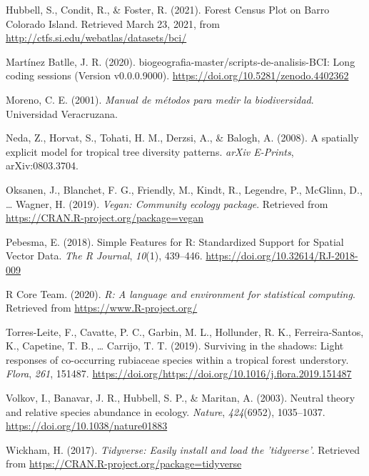 \documentclass[11pt,]{article}
\begin{document}
\hypertarget{ref-web_bci}{}
Hubbell, S., Condit, R., \& Foster, R. (2021). Forest Census Plot on
Barro Colorado Island. Retrieved March 23, 2021, from
\url{http://ctfs.si.edu/webatlas/datasets/bci/}

\hypertarget{ref-jose_ramon_martinez_batlle_2020_4402362}{}
Martínez Batlle, J. R. (2020).
biogeografia-master/scripts-de-analisis-BCI: Long coding sessions
(Version v0.0.0.9000). \url{https://doi.org/10.5281/zenodo.4402362}

\hypertarget{ref-moreno2001manual}{}
Moreno, C. E. (2001). \emph{Manual de métodos para medir la
biodiversidad}. Universidad Veracruzana.

\hypertarget{ref-2008arXiv0803.3704N}{}
Neda, Z., Horvat, S., Tohati, H. M., Derzsi, A., \& Balogh, A. (2008). A
spatially explicit model for tropical tree diversity patterns.
\emph{arXiv E-Prints}, arXiv:0803.3704.

\hypertarget{ref-cita_vegan}{}
Oksanen, J., Blanchet, F. G., Friendly, M., Kindt, R., Legendre, P.,
McGlinn, D., \ldots{} Wagner, H. (2019). \emph{Vegan: Community ecology
package}. Retrieved from \url{https://CRAN.R-project.org/package=vegan}

\hypertarget{ref-cita_sf}{}
Pebesma, E. (2018). Simple Features for R: Standardized Support for
Spatial Vector Data. \emph{The R Journal}, \emph{10}(1), 439--446.
\url{https://doi.org/10.32614/RJ-2018-009}

\hypertarget{ref-cita_r}{}
R Core Team. (2020). \emph{R: A language and environment for statistical
computing}. Retrieved from \url{https://www.R-project.org/}

\hypertarget{ref-TORRESLEITE2019151487}{}
Torres-Leite, F., Cavatte, P. C., Garbin, M. L., Hollunder, R. K.,
Ferreira-Santos, K., Capetine, T. B., \ldots{} Carrijo, T. T. (2019).
Surviving in the shadows: Light responses of co-occurring rubiaceae
species within a tropical forest understory. \emph{Flora}, \emph{261},
151487.
\url{https://doi.org/https://doi.org/10.1016/j.flora.2019.151487}

\hypertarget{ref-Volkov_2003}{}
Volkov, I., Banavar, J. R., Hubbell, S. P., \& Maritan, A. (2003).
Neutral theory and relative species abundance in ecology. \emph{Nature},
\emph{424}(6952), 1035--1037. \url{https://doi.org/10.1038/nature01883}

\hypertarget{ref-cita_tidyverse}{}
Wickham, H. (2017). \emph{Tidyverse: Easily install and load the
'tidyverse'}. Retrieved from
\url{https://CRAN.R-project.org/package=tidyverse}




\newpage
\singlespacing 
\end{document}
